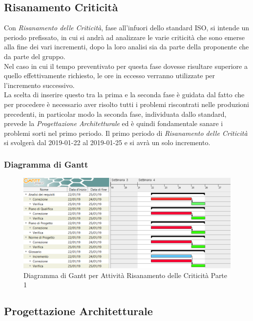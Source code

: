 \subsection{Risanamento Criticità}
\label{RC1}

Con \textit{Risanamento delle Criticità}, fase all'infuori dello standard ISO, si intende un periodo prefissato, in cui si andrà ad analizzare le varie criticità che sono emerse alla fine dei vari incrementi, dopo la loro analisi sia da parte della proponente che da parte del gruppo. \\
Nel caso in cui il tempo preventivato per questa fase dovesse risultare superiore a quello effettivamente richiesto, le ore in eccesso verranno utilizzate per l'incremento successivo.\\
La scelta di inserire questo tra la prima e la seconda fase è guidata dal fatto che per procedere è necessario aver risolto tutti i problemi riscontrati nelle produzioni precedenti, in particolar modo la seconda fase, individuata dallo standard, prevede la \textit{Progettazione Architetturale} ed è quindi fondamentale sanare i problemi sorti nel primo periodo. 
Il primo periodo di \textit{Risanamento delle Criticità} si svolgerà dal 2019-01-22 al 2019-01-25  e si avrà un solo incremento.

\subsubsection{Diagramma di Gantt}

\begin{figure}[h]
	\centering
  		\includegraphics[width=1.0\linewidth]{./images/RisanamentoCriticita1.png}
  		\caption{Diagramma di Gantt per Attività Risanamento delle Criticità Parte 1}
  		\label{fig:Gantt Risananmento Criticità 1}
\end{figure}

\newpage
\subsection{Progettazione Architetturale}
\label{PA}

